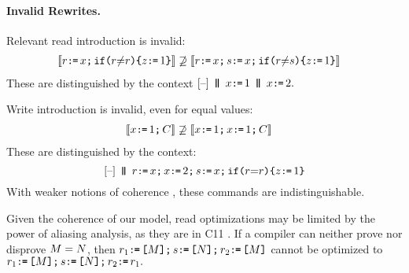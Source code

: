 



\paragraph{Invalid Rewrites.}
Relevant read introduction is invalid:
\begin{align*}
  \sem{\aReg \GETS \aLoc \SEMI \IF{\aReg {\neq} \aReg} \THEN \cLoc \GETS 1 \FI}
  &\not\supseteq
  \sem{\aReg \GETS \aLoc \SEMI \bReg \GETS \aLoc  \SEMI \IF{\aReg {\neq}\bReg} \THEN \cLoc \GETS 1 \FI}
\end{align*}
These are distinguished by the context
\begin{math}
  \hole{} \PAR x\GETS1\PAR x\GETS2.
\end{math}

Write introduction is invalid, even for equal values:
\begin{align*}
  \sem{\aLoc \GETS 1 \SEMI \aCmd} 
  &\not\supseteq
  \sem{\aLoc \GETS 1 \SEMI \aLoc \GETS 1 \SEMI \aCmd}
\end{align*}
These are distinguished by the context:
\begin{displaymath}
  \hole{} \PAR
  r\GETS x \SEMI
  x\GETS2 \SEMI
  s\GETS x\SEMI
  \IF{\aReg {=} \aReg} \THEN \cLoc \GETS 1 \FI
\end{displaymath}
With weaker notions of coherence
\cite{Manson:2005:JMM:1047659.1040336, Dolan:2018:BDR:3192366.3192421}, these
commands are indistinguishable.

Given the coherence of our model, read optimizations may be limited by the power
of aliasing analysis, as they are in C11 \cite[]{DBLP:conf/java/Pugh99}.  If a
compiler can neither prove nor disprove $\aExp=\bExp$, then
\begin{math}
  r_1\GETS \REF{\aExp} \SEMI
  s\GETS \REF{\bExp} \SEMI  
  r_2\GETS \REF{\aExp}
\end{math}
cannot be optimized to
\begin{math}
  r_1\GETS \REF{\aExp} \SEMI
  s\GETS \REF{\bExp} \SEMI  
  r_2\GETS r_1.
\end{math}

